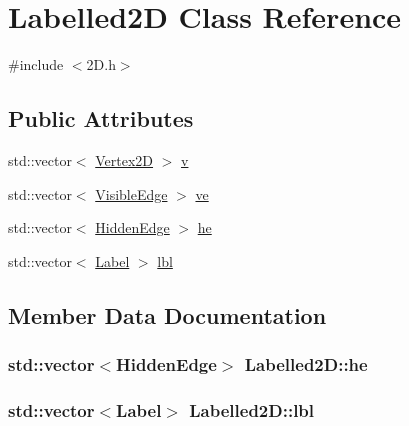 \hypertarget{class_labelled2_d}{}\section{Labelled2D Class Reference}
\label{class_labelled2_d}


{\ttfamily \#include $<$2\+D.\+h$>$}

\subsection*{Public Attributes}
\begin{DoxyCompactItemize}
\item 
std\+::vector$<$ \hyperlink{class_vertex2_d}{Vertex2D} $>$ \hyperlink{class_labelled2_d_ab677e79d5e4bcfebbeb83dc38e5511e4}{v}
\item 
std\+::vector$<$ \hyperlink{class_visible_edge}{Visible\+Edge} $>$ \hyperlink{class_labelled2_d_ade711f960ea78222660c68b7ea29840b}{ve}
\item 
std\+::vector$<$ \hyperlink{class_hidden_edge}{Hidden\+Edge} $>$ \hyperlink{class_labelled2_d_a166043f03faf313ef3772c14daf2604f}{he}
\item 
std\+::vector$<$ \hyperlink{class_label}{Label} $>$ \hyperlink{class_labelled2_d_a16b9a518c00306b5183d1775339efeff}{lbl}
\end{DoxyCompactItemize}


\subsection{Member Data Documentation}
\subsubsection[{\texorpdfstring{he}{he}}]{\setlength{\rightskip}{0pt plus 5cm}std\+::vector$<${\bf Hidden\+Edge}$>$ Labelled2\+D\+::he}\hypertarget{class_labelled2_d_a166043f03faf313ef3772c14daf2604f}{}\label{class_labelled2_d_a166043f03faf313ef3772c14daf2604f}
\subsubsection[{\texorpdfstring{lbl}{lbl}}]{\setlength{\rightskip}{0pt plus 5cm}std\+::vector$<${\bf Label}$>$ Labelled2\+D\+::lbl}\hypertarget{class_labelled2_d_a16b9a518c00306b5183d1775339efeff}{}\label{class_labelled2_d_a16b9a518c00306b5183d1775339efeff}
